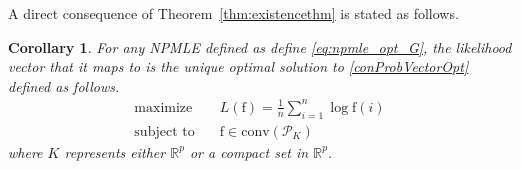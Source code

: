 \documentclass[11pt]{article}
\numberwithin{equation}{section}
\newtheorem{corollary}{Corollary}[section]
\newcommand{\RS}{\mathbb{R}}
\newcommand{\PS}{\mathcal{P}}
\newcommand{\fv}{\mathrm{f}}
\begin{document}
A direct consequence of Theorem~\ref{thm:existencethm} is stated as follows.
\begin{corollary} For any NPMLE defined as define \eqref{eq:npmle_opt_G}, the likelihood vector that it maps to is the unique optimal solution to \eqref{conProbVectorOpt} defined as follows.
\begin{equation}
\begin{split}
\text{maximize} & \quad L(\fv) = \frac{1}{n} \sum_{i=1}^n \log \fv(i)\\
\text{subject to} & \quad \fv \in \mathrm{conv}(\PS_K)
\end{split}
\label{conProbVectorOpt}
\end{equation}
where $K$ represents either $\RS^p$ or a compact set in $\RS^p$.
\label{cor:existence}
\end{corollary}
\end{document}

